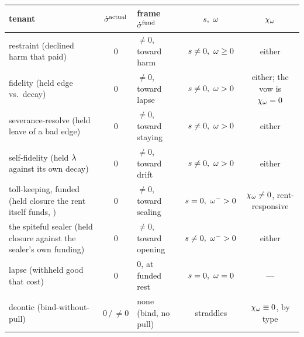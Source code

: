 \documentclass[../main]{subfiles}
\begin{document}
\begin{table}[htbp]
  \centering
  \begin{tabularx}{\textwidth}{@{} L c L c c @{}}
    \toprule
    \textbf{tenant} & $\dot{\sigma}\sp{\mathrm{actual}}$ & \textbf{frame $\dot{\sigma}\sp{\mathrm{fund}}$}
      & $s,\ \omega$ & $\chi\sb{\omega}$ \\
    \midrule
     restraint (declined harm that paid) & $0$ & $\neq0$, toward harm
      & $\moralvel\neq0,\ \will\ge0$ & either \\
    \addlinespace
     fidelity (held edge vs.\ decay) & $0$ & $\neq0$, toward lapse
      & $\moralvel\neq0,\ \will>0$ & either; the vow is $\chi\sb{\omega}=0$ \\
    \addlinespace
     severance-resolve (held leave of a bad edge) & $0$
      & $\neq0$, toward staying & $\moralvel\neq0,\ \will>0$ & either \\
    \addlinespace
     self-fidelity (held $\lambda$ against its own decay) & $0$
      & $\neq0$, toward drift & $\moralvel\neq0,\ \will>0$ & either \\
    \addlinespace
     toll-keeping, funded (held closure the rent itself funds,
      ) & $0$
      & $\neq0$, toward sealing & $\moralvel=0,\ \willanti>0$
      & $\chi\sb{\omega}\neq0$, rent-responsive \\
    \addlinespace
     the spiteful sealer (held closure against the sealer's own
      funding) & $0$
      & $\neq0$, toward opening & $\moralvel\neq0,\ \willanti>0$ & either \\
    \addlinespace
     lapse (withheld good that cost) & $0$ & $0$, at funded rest
      & $\moralvel=0,\ \will=0$ & --- \\
    \addlinespace
     deontic (bind-without-pull) & $0\,/\,{\neq}0$ & none (bind, no pull)
      & straddles & $\chi\sb{\omega}\equiv0$, by type \\
    \bottomrule
  \end{tabularx}
\end{table}
\end{document}
